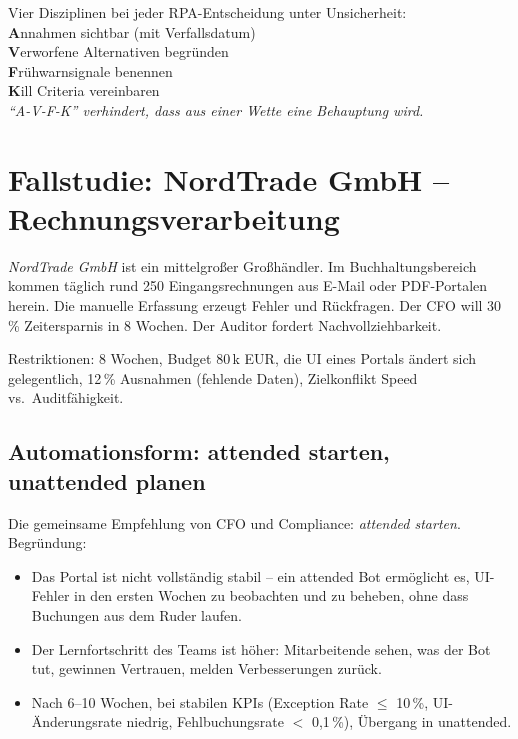 \documentclass[11pt,a4paper,oneside]{article}
\newcommand{\caveatfontfallback}{\itshape}
\newcommand\caveatfont{\caveatfontfallback}%
\newcommand{\akzent}[1]{{\caveatfont\color{lpAmber}#1}}
\begin{document}
\begin{eselsbox}[Eselsbrücke: \akzent{A-V-F-K}]
Vier Disziplinen bei jeder RPA-Entscheidung unter Unsicherheit:\\[2pt]
\textbf{A}nnahmen sichtbar (mit Verfallsdatum)\\
\textbf{V}erworfene Alternativen begründen\\
\textbf{F}rühwarnsignale benennen\\
\textbf{K}ill Criteria vereinbaren\\[2pt]
\emph{``A-V-F-K'' verhindert, dass aus einer Wette eine Behauptung wird.}
\end{eselsbox}

\section{Fallstudie: NordTrade GmbH -- Rechnungsverarbeitung}

\emph{NordTrade GmbH} ist ein mittelgroßer Großhändler. Im Buchhaltungsbereich kommen täglich rund 250 Eingangsrechnungen aus E-Mail oder PDF-Portalen herein. Die manuelle Erfassung erzeugt Fehler und Rückfragen. Der CFO will 30\,\% Zeitersparnis in 8 Wochen. Der Auditor fordert Nachvollziehbarkeit.

Restriktionen: 8 Wochen, Budget 80\,k EUR, die UI eines Portals ändert sich gelegentlich, 12\,\% Ausnahmen (fehlende Daten), Zielkonflikt Speed vs.\ Auditfähigkeit.

\subsection{Automationsform: attended starten, unattended planen}

Die gemeinsame Empfehlung von CFO und Compliance: \emph{attended starten}. Begründung:

\begin{itemize}
  \item Das Portal ist nicht vollständig stabil -- ein attended Bot ermöglicht es, UI-Fehler in den ersten Wochen zu beobachten und zu beheben, ohne dass Buchungen aus dem Ruder laufen.
  \item Der Lernfortschritt des Teams ist höher: Mitarbeitende sehen, was der Bot tut, gewinnen Vertrauen, melden Verbesserungen zurück.
  \item Nach 6--10 Wochen, bei stabilen KPIs (Exception Rate $\leq$ 10\,\%, UI-Änderungsrate niedrig, Fehlbuchungsrate $<$ 0,1\,\%), Übergang in unattended.
\end{itemize}
\end{document}
